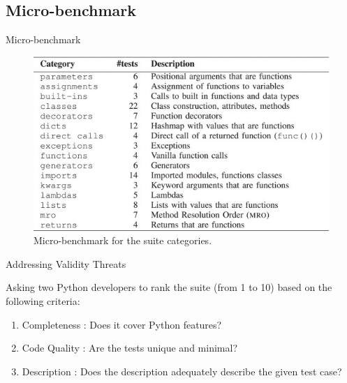 \documentclass[9pt, xcolor=table]{beamer}
\begin{document}
\subsection{Micro-benchmark}
%
\begin{frame}{Micro-benchmark}
	\begin{figure}[htp]
		\centering
		\includegraphics[width=\textwidth,height=0.6\paperheight]{Micro-Benchmark.jpg}
		\caption{Micro-benchmark for the suite categories.}
		\label{fig:micro_benchmark}
	\end{figure}
	
\end{frame}
%
\begin{frame}{Addressing Validity Threats}
	
	Asking two Python developers to rank the suite (from 1 to 10) based on the following criteria:
	\begin{exampleblock}{}
		\begin{enumerate}
			\item Completeness : Does it cover Python features?
			\item Code Quality : Are the tests unique and minimal?
			\item Description : Does the description adequately describe the given test case?
		\end{enumerate}
	\end{exampleblock}
\end{frame}
%
\end{document}
